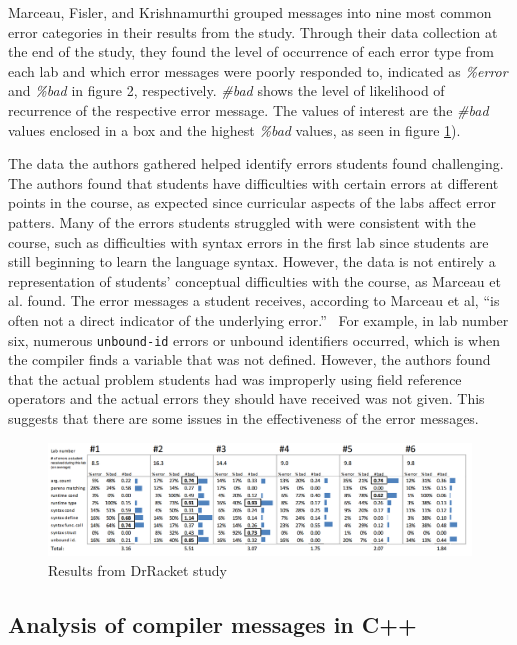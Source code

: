 \documentclass{sig-alternate}
\begin{document}
Marceau, Fisler, and Krishnamurthi grouped messages into nine most common error categories in their results from the study.
Through their data collection at the end of the study, they found the level of occurrence of each error type from each lab and which error messages were poorly responded to, indicated as \textit{\%error} and \textit{\%bad} in figure 2, respectively.
\textit{\#bad} shows the level of likelihood of recurrence of the respective error message.
The values of interest are the \textit{\#bad} values enclosed in a box and the highest \textit{\%bad} values, as seen in figure \ref{fig:drracketstudy}). 

The data the authors gathered helped identify errors students found challenging.
The authors found that students have difficulties with certain errors at different points in the course, as expected since curricular aspects of the labs affect error patters.
Many of the errors students struggled with were consistent with the course, such as difficulties with syntax errors in the first lab since students are still beginning to learn the language syntax.
However, the data is not entirely a representation of students' conceptual difficulties with the course, as Marceau et al. found.
The error messages a student receives, according to Marceau et al, ``is often not a direct indicator of the underlying error.''~\cite{Marceau:2011:MEE:1953163.1953308}
For example, in lab number six, numerous \texttt{unbound-id} errors  or unbound identifiers occurred, which is when the compiler finds a variable that was not defined.
However, the authors found that the actual problem students had was improperly using field reference operators and the actual errors they should have received was not given.
This suggests that there are some issues in the effectiveness of the error messages.

\begin{figure}
  \centering
  \includegraphics[keepaspectratio, width=\textwidth]{MEE_Data.png}
  \caption{Results from DrRacket study}
  \label{fig:drracketstudy}
\end{figure}

\subsection{Analysis of compiler messages in C++}\label{subsec:compiler analysis}
\end{document}
